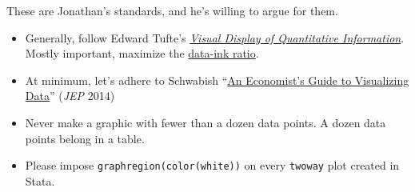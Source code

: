 These are Jonathan's standards, and he's willing to argue for them.

\begin{itemize}
	\item Generally, follow Edward Tufte's \href{https://www.edwardtufte.com/tufte/books_vdqi}{\textit{Visual Display of Quantitative Information}}.
	Mostly important, maximize the \href{https://www.coursera.org/learn/python-plotting/lecture/qFnP9/graphical-heuristics-data-ink-ratio-edward-tufte}{data-ink ratio}.
	\item At minimum, let's adhere to Schwabish ``\href{https://www.aeaweb.org/articles?id=10.1257/jep.28.1.209}{An Economist's Guide to Visualizing Data}'' (\textit{JEP} 2014)
	\item Never make a graphic with fewer than a dozen data points. A dozen data points belong in a table.
	\item Please impose \texttt{graphregion(color(white))} on every \texttt{twoway} plot created in Stata.
\end{itemize}

